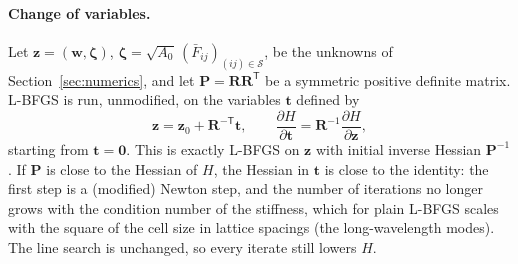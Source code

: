 \documentclass[11pt,a4paper]{article}
\newcommand{\w}{\mathbf w}
\begin{document}
\paragraph{Change of variables.}
Let \(\mathbf z=(\w,\bm\zeta)\), \(\bm\zeta=\sqrt{A_0}\,(\bar F_{ij})_{(ij)\in\mathcal S}\), be the unknowns
of Section~\ref{sec:numerics}, and let \(\mathbf P=\mathbf R\mathbf R^{\mathsf T}\) be a symmetric
positive definite matrix. L-BFGS is run, unmodified, on the variables \(\mathbf t\) defined by
\begin{equation}
  \mathbf z=\mathbf z_0+\mathbf R^{-\mathsf T}\mathbf t,\qquad
  \frac{\partial H}{\partial\mathbf t}=\mathbf R^{-1}\frac{\partial H}{\partial\mathbf z},
  \label{eq:cov}
\end{equation}
starting from \(\mathbf t=\mathbf 0\). This is exactly L-BFGS on \(\mathbf z\) with initial inverse
Hessian \(\mathbf P^{-1}\). If \(\mathbf P\) is close to the Hessian of \(H\), the Hessian in
\(\mathbf t\) is close to the identity: the first step is a (modified) Newton step, and the number of
iterations no longer grows with the condition number of the stiffness, which for plain L-BFGS scales
with the square of the cell size in lattice spacings (the long-wavelength modes). The line search is
unchanged, so every iterate still lowers \(H\).
\end{document}
